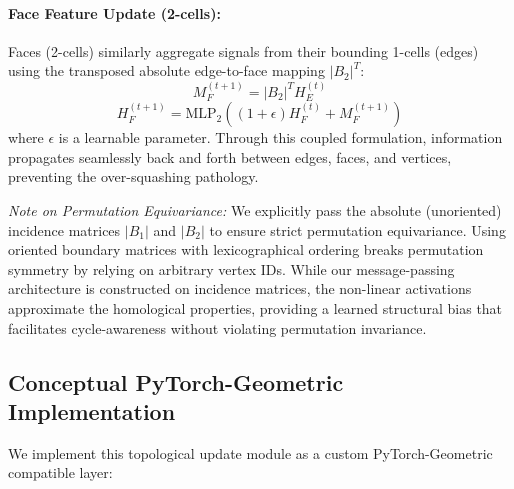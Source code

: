 \documentclass[11pt, letterpaper]{article}
\begin{document}
\paragraph{Face Feature Update (2-cells):}
Faces (2-cells) similarly aggregate signals from their bounding 1-cells (edges) using the transposed absolute edge-to-face mapping $|B_2|^T$:
\begin{equation}
    M_F^{(t+1)} = |B_2|^T H_E^{(t)}
\end{equation}
\begin{equation}
    H_F^{(t+1)} = \text{MLP}_2\left( (1 + \epsilon) H_F^{(t)} + M_F^{(t+1)} \right)
\end{equation}
where $\epsilon$ is a learnable parameter. Through this coupled formulation, information propagates seamlessly back and forth between edges, faces, and vertices, preventing the over-squashing pathology.

\emph{Note on Permutation Equivariance:} We explicitly pass the absolute (unoriented) incidence matrices $|B_1|$ and $|B_2|$ to ensure strict permutation equivariance. Using oriented boundary matrices with lexicographical ordering breaks permutation symmetry by relying on arbitrary vertex IDs. While our message-passing architecture is constructed on incidence matrices, the non-linear activations approximate the homological properties, providing a learned structural bias that facilitates cycle-awareness without violating permutation invariance.

\subsection{Conceptual PyTorch-Geometric Implementation}
We implement this topological update module as a custom PyTorch-Geometric compatible layer:
\end{document}
